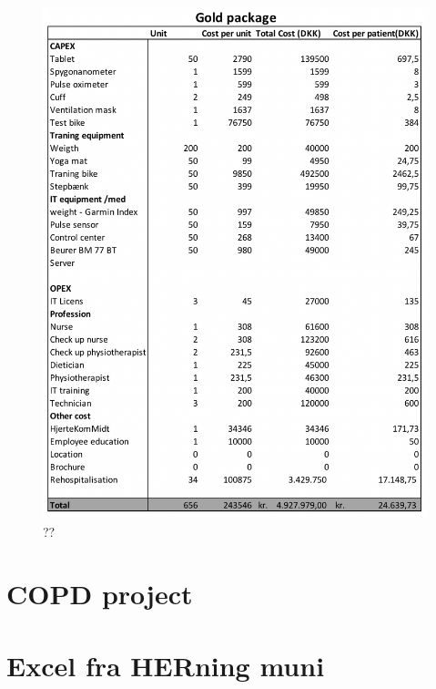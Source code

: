 \begin{figure}[H]
\centering
\includegraphics[width=1\textwidth]{Figure/Gold.png}
\caption{??}
\label{fig: Gold}
\end{figure} 




\chapter{COPD project}

\chapter{Excel fra HERning muni}
